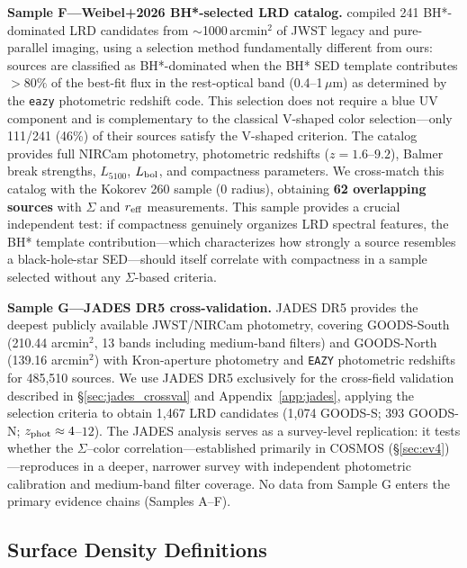 \documentclass[twocolumn,linenumbers]{aastex631}
\begin{document}
\textbf{Sample F---Weibel+2026 BH*-selected LRD catalog.} \citet{Weibel2026} compiled 241 BH*-dominated LRD candidates from $\sim$1000\,arcmin$^2$ of JWST legacy and pure-parallel imaging, using a selection method fundamentally different from ours: sources are classified as BH*-dominated when the BH* SED template contributes ${>}80\%$ of the best-fit flux in the rest-optical band (0.4--1\,$\mu$m) as determined by the \texttt{eazy} photometric redshift code. This selection does not require a blue UV component and is complementary to the classical V-shaped color selection---only 111/241 (46\%) of their sources satisfy the \citet{Kokorev2024} V-shaped criterion. The catalog provides full NIRCam photometry, photometric redshifts ($z=1.6$--$9.2$), Balmer break strengths, $L_{5100}$, $L_{\rm bol}$, and compactness parameters. We cross-match this catalog with the Kokorev 260 sample (0 radius), obtaining \textbf{62 overlapping sources} with $\Sigma$ and $r_{\rm eff}$ measurements. This sample provides a crucial independent test: if compactness genuinely organizes LRD spectral features, the BH* template contribution---which characterizes how strongly a source resembles a black-hole-star SED---should itself correlate with compactness in a sample selected without any $\Sigma$-based criteria.

\textbf{Sample G---JADES DR5 cross-validation.} JADES DR5 \citep{JADESDR5} provides the deepest publicly available JWST/NIRCam photometry, covering GOODS-South (210.44 arcmin$^2$, 13 bands including medium-band filters) and GOODS-North (139.16 arcmin$^2$) with Kron-aperture photometry and \texttt{EAZY} photometric redshifts for 485,510 sources. We use JADES DR5 exclusively for the cross-field validation described in \S\ref{sec:jades_crossval} and Appendix~\ref{app:jades}, applying the \citet{Rinaldi2026} selection criteria to obtain 1,467 LRD candidates (1,074 GOODS-S; 393 GOODS-N; $z_{\rm phot} \approx 4$--$12$). The JADES analysis serves as a survey-level replication: it tests whether the $\Sigma$--color correlation---established primarily in COSMOS (\S\ref{sec:ev4})---reproduces in a deeper, narrower survey with independent photometric calibration and medium-band filter coverage. No data from Sample G enters the primary evidence chains (Samples A--F).

\subsection{Surface Density Definitions}
\end{document}
